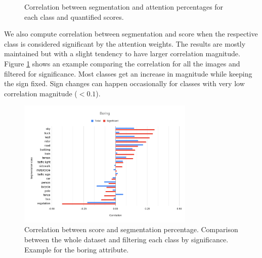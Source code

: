 \begin{figure}[ht]
{	}
	\hspace{0mm}
	\caption{
		Correlation between segmentation and attention percentages for each class and
		quantified scores.
		}
\end{figure}
\label{fig:correlations}

We also compute correlation between segmentation and score when the respective class is
considered significant by the attention weights. The results are mostly maintained but with
a slight tendency to have larger correlation magnitude. Figure \ref{fig:correlation_significant}
shows an example comparing the correlation for all the images and filtered for significance.
Most classes get an increase in magnitude while keeping the sign fixed. Sign changes can happen
occasionally for classes with very low correlation magnitude ($< 0.1$).

\begin{figure}[ht]
	\begin{center}
	\includegraphics[width=0.75\textwidth]{./figures/boring_correlation_significant.png}
	\caption[Correlation comparison for significant images]{
		Correlation between score and segmentation percentage. Comparison between
		the whole dataset and filtering each class
		by significance. Example for the boring attribute.
        }
	\label{fig:correlation_significant}
	\end{center}
\end{figure}

